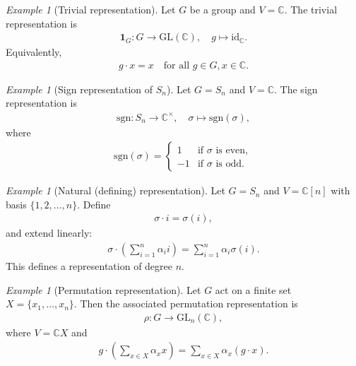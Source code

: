\documentclass[titlepage]{article}
\theoremstyle{plain}
\theoremstyle{definition}
\theoremstyle{remark}
\newtheorem{example}[remark]{Example}
\theoremstyle{exercise-style}
\numberwithin{equation}{section}
\numberwithin{theorem}{section}
\numberwithin{remark}{section}
\begin{document}
\begin{example}[Trivial representation]
    Let $G$ be a group and $V = \mathbb{C}$. The trivial representation is
    \begin{align}
        \mathbf{1}_G: G \to \mathrm{GL}(\mathbb{C}), \quad g \mapsto \mathrm{id}_{\mathbb{C}}.
    \end{align}
    Equivalently,
    \begin{align}
        g \cdot x = x \quad \text{for all } g \in G, x \in \mathbb{C}.
    \end{align}
\end{example}

\begin{example}[Sign representation of $S_n$]
    Let $G = S_n$ and $V = \mathbb{C}$. The sign representation is
    \begin{align}
        \mathrm{sgn}: S_n \to \mathbb{C}^\times, \quad \sigma \mapsto \mathrm{sgn}(\sigma),
    \end{align}
    where
    \begin{align}
        \mathrm{sgn}(\sigma) =
        \begin{cases}
        1 & \text{if $\sigma$ is even}, \\
        -1 & \text{if $\sigma$ is odd}.
        \end{cases}
    \end{align}
\end{example}

\begin{example}[Natural (defining) representation]
    Let $G = S_n$ and $V = \mathbb{C}[n]$ with basis $\{1,2,\dots,n\}$. Define
    \begin{align}
        \sigma \cdot i = \sigma(i),
    \end{align}
    and extend linearly:
    \begin{align}
        \sigma \cdot \left( \sum_{i=1}^n \alpha_i i \right) = \sum_{i=1}^n \alpha_i \sigma(i).
    \end{align}
    This defines a representation of degree $n$.
\end{example}

\begin{example}[Permutation representation]
    Let $G$ act on a finite set $X = \{x_1,\dots,x_n\}$. Then the associated permutation representation is
    \begin{align}
        \rho: G \to \mathrm{GL}_n(\mathbb{C}),
    \end{align}
    where $V = \mathbb{C}X$ and
    \begin{align}
        g \cdot \left( \sum_{x \in X} \alpha_x x \right) = \sum_{x \in X} \alpha_x (g \cdot x).
    \end{align}
\end{example}
\end{document}
